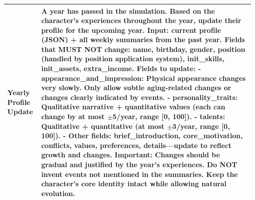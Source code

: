 \begin{table}[h]
\begin{tabular}{p{0.8in}p{4.3in}}
\\
\midrule

\textbf{Yearly \newline Profile \newline Update} &

A year has passed in the simulation. Based on the character's experiences throughout the year, update their profile for the upcoming year.
\vspace{3pt}\newline
\textbf{Input:} current profile (JSON) + all weekly summaries from the past year.
\vspace{4pt}\newline
\textbf{Fields that MUST NOT change:}
\newline name, birthday, gender, position (handled by position application system), init\_skills, init\_assets, extra\_income.
\vspace{4pt}\newline
\textbf{Fields to update:}
\newline - \textbf{appearance\_and\_impression}: Physical appearance changes very slowly. Only allow subtle aging-related changes or changes clearly indicated by events.
\newline - \textbf{personality\_traits}: Qualitative narrative + quantitative values (each can change by at most $\pm$5/year, range [0, 100]).
\newline - \textbf{talents}: Qualitative + quantitative (at most $\pm$3/year, range [0, 100]).
\newline - \textbf{Other fields}: brief\_introduction, core\_motivation, conflicts, values, preferences, details---update to reflect growth and changes.
\vspace{4pt}\newline
\textbf{Important:} Changes should be gradual and justified by the year's experiences. Do NOT invent events not mentioned in the summaries. Keep the character's core identity intact while allowing natural evolution.

\\
\bottomrule
\end{tabular}
\end{table}
